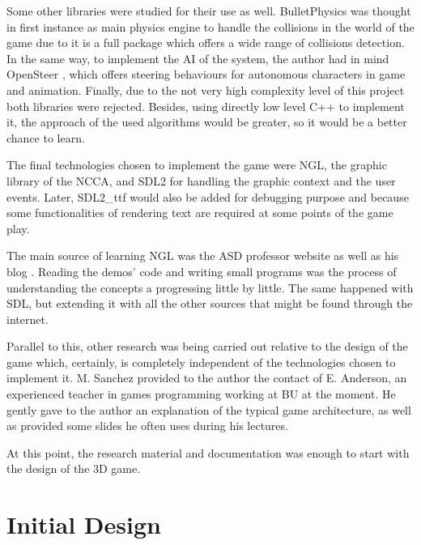 \documentclass[]{article}
\begin{document}
 Some other libraries were studied for their use as well. BulletPhysics \cite{bulletPhysics} was thought in first instance as main physics engine to handle the collisions in the world of the game
 due to it is a full package which offers a wide range of collisions detection. In the same way, to implement the AI of the system, the author had in mind OpenSteer \cite{openSteer}, which offers
 steering behaviours for autonomous characters in game and animation. Finally, due to the not very high complexity level of this project both libraries were rejected. Besides, using directly
 low level C++ to implement it, the approach of the used algorithms would be greater, so it would be a better chance to learn.
 
 The final technologies chosen to implement the game were NGL, the graphic library of the NCCA, and SDL2 for handling the graphic context and the user events. Later, SDL2\_ttf would also be
 added for debugging purpose and because some functionalities of rendering text are required at some points of the game play.
 
 The main source of learning NGL was the ASD professor website \cite{maceyWebsite} as well as his blog \cite{maceyBlog}. Reading the demos' code and writing small programs was the process of understanding the concepts a progressing 
 little by little. The same happened with SDL, but extending it with all the other sources that might be found through the internet.
 
 Parallel to this, other research was being carried out relative to the design of the game which, certainly, is completely independent of the technologies chosen to implement it. M. Sanchez provided
 to the author the contact of E. Anderson, an experienced teacher in games programming working at BU at the moment. He gently gave to the author an explanation of the typical game architecture, as well as provided 
 some slides he often uses during his lectures.
 
 At this point, the research material and documentation was enough to start with the design of the 3D game.

 

\section{Initial Design}
\end{document}
